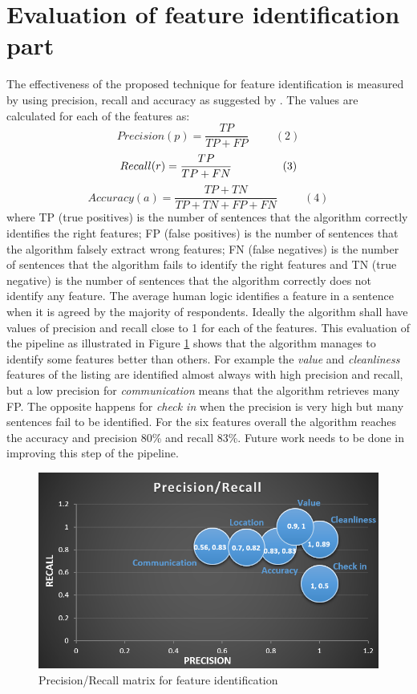 \section{Evaluation of feature identification part}
The effectiveness of the proposed technique for feature identification is measured by using precision, recall and accuracy as suggested by \cite{huang2006performance}. The values are calculated for each of the features as:
$$ Precision  (p) =\frac{TP}{TP+FP}\hspace{1cm}(2)$$
$$ Recall  (r) = \frac{TP}{TP + FN}\hspace{1.6cm}(3) $$
$$ Accuracy (a) = \frac{TP + TN}{TP+TN+FP+FN} \hspace{1cm}(4)$$
where TP (true positives) is the number of sentences that the algorithm correctly identifies the right features; FP (false positives) is the number of sentences that the algorithm falsely extract wrong features; FN (false negatives) is the number of sentences that the algorithm fails to identify the right features and TN (true negative) is the number of sentences that the algorithm correctly does not identify any feature. The average human logic identifies a feature in a sentence when it is agreed by the majority of respondents. Ideally the algorithm shall have values of precision and recall close to 1 for each of the features. This evaluation of the pipeline as illustrated in Figure \ref{fig:matrix} shows that the algorithm manages to identify some features better than others. For example the \textit{value} and \textit{cleanliness} features of the listing are identified almost always with high precision and recall, but a low precision for \textit{communication} means that the algorithm retrieves many FP. The opposite happens for \textit{check in} when the precision is very high but many sentences fail to be identified. For the six features overall the algorithm reaches the accuracy and precision 80\% and recall 83\%. Future work needs to be done in improving this step of the pipeline.
\begin{figure}[h!]
	\centering
	\includegraphics{precision_recall_1}
	\caption{Precision/Recall matrix for feature identification}
	\label{fig:matrix}
\end{figure}
